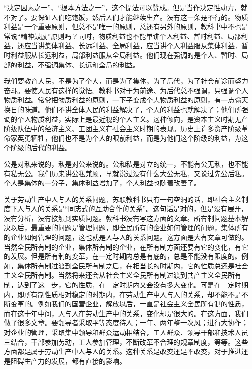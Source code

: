 “决定因素之一”、“根本方法之一”，这个提法可以赞成。但是当作决定性动力，就不对了。要保证人们吃饱饭，然后人们才能继续生产。没有这一条是不行的。物质利益是一个重要原则，但总不是唯一的原则，总还有另外的原则，教科书中不也是常说“精神鼓励”原则吗？同时，物质利益也不能单讲个人利益、暂时利益、局部利益，还应当讲集体利益、长远利益、全局利益，应当讲个人利益服从集体利益，暂时利益服从长远利益，局部利益服从全局利益。他们现在强调的是个人、暂时、局部的利益，不强调集体、长远和全局的利益。

我们要教育人民，不是为了个人，而是为了集体，为了后代，为了社会前途而努力奋斗。要使人民有这样的觉悟。教科书对于为前途、为后代总不强调，只强调个人物质利益。常常把物质利益的原则，一下子变成个人物质利益的原则，有一点偷天换日的味道。他们不讲全体人民的利益解决了，个人的利益也就解决了；他们所强调的个人物质利益，实际上是最近视的个人主义。这种倾向，是资本主义时期无产阶级队伍中的经济主义、工团主义在社会主义时期的表现。历史上许多资产阶级革命家英勇牺牲，他们也不是为个人的眼前利益，而是为他们这个阶级的利益，为这个阶级的后代的利益。

公是对私来说的，私是对公来说的。公和私是对立的统一，不能有公无私，也不能有私无公。我们历来讲公私兼顾，早就说过没有什么大公无私，又说过先公后私。个人是集体的一分子，集体利益增加了，个人利益也随着改善了。

关于劳动生产中人与人的关系问题，苏联教科书只有一句空洞的话，即社会主义制度下人与人的关系是“同志式的互助合作的关系”。这句话是对的，但是没有展开，没有分析，没有接触到实质问题。教科书没有写这方面的文章。所有制问题基本解决以后，最重要的问题是管理问题，即全民所有的企业如何管理的问题，集体所有的企业如何管理的问题，这也就是人与人的关系问题。这方面是大有文章可做的。当然全民所有制的企业，集体所有制的企业，在所有制方面还要有它的变化，有它的发展。但是所有制的变革，在一定时期内总是有底的，总是不能没有限度的。例如，集体所有制过渡到全民所有制之后，在相当长的时期内，它的性质总还是社会主义全民所有制。当然将来还会从社会主义全民所有制过渡到共产主义全民所有制，达到了这一步，它的性质，在一定时期内又会没有多大变化。可是在一定时期内，即所有制性质相对稳定的时期内，在劳动生产中人与人的关系，却不能不是不断变革的。例如我们的国营企业，解放以后，一直是社会主义全民所有制的性质，而在这十年中间，人与人在劳动生产中的关系，变化却是很大的。在这方面，我们做了很多文章。要领导者采取平等态度待人；一年、两年整一次风；进行大协作；对企业的管理，采取集中领导和群众运动相结合，工人群众、领导干部和技术人员三结合，干部参加劳动，工人参加管理，不断改革不合理的规章制度，等等。这些方面都是属于劳动生产中人与人的关系。这种关系是改变还是不改变，对于推进还是阻碍生产力的发展，都有直接的影响。

